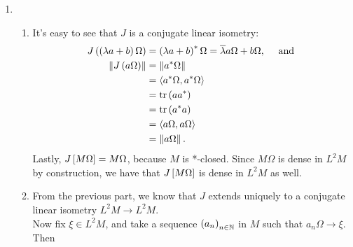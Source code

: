 \documentclass[a4paper,10pt]{report}
\newcommand{\pn}[2]{||#1||_{#2}}
\newcommand{\norm}[1]{||#1||}
\begin{document}
\begin{enumerate}
\begin{enumerate}
\begin{enumerate}
						\begin{proof}
						If $\varphi$ is faithful, then for $x\neq y$, we have 
							\begin{align*}
								\norm{\pi_\varphi(x-y)}^2 &\ge \pn{\pi_\varphi(x-y)\Omega}{\varphi}^2\\
								&= \varphi((x-y)^*(x-y))\\
								& > 0,
							 \end{align*}
							since $(x - y)^*(x- y)$ is a nonzero positive operator.
							Hence, $\pi_\varphi$ is a faithful representation and the claim follows from (2).
							\end{proof}
				\end{enumerate}
		\end{enumerate}
		\setcounter{enumi}{90}
		\newpage
 \item 
		\begin{enumerate}
		\item It's easy to see that $J$ is a conjugate linear isometry: 
                  \begin{align*}
                    J \E \E \lambda a + b \R \Omega \R%
                    &= \E \lambda a + b \R^* \Omega = \ba \lambda a \Omega + b \Omega, \quad \text{ and }\\
                    \NK J \E a \Omega \R \KN%
                    &= \NK a^* \Omega \KN\\
                    &= \ET a^* \Omega , a^* \Omega \TE\\
                    &= \tr \E a a^* \R\\
                    &= \tr \E a^* a \R\\
                    &= \ET a \Omega , a \Omega \TE\\
                    &= \NK a \Omega \KN.
                  \end{align*}
                  Lastly, $J \left[ M \Omega \right] = M \Omega$, because $M$ is *-closed.  Since $M \Omega$ is dense in $L^2 M$ by construction, we have that $J \left[ M \Omega \right]$ is dense in $L^2 M$ as well.
                \item From the previous part, we know that $J$ extends uniquely to a conjugate linear isometry $L^2 M \to L^2 M$.\\
                  Now fix $\xi \in L^2 M$, and take a sequence $\left( a_n \right)_{n \in \mathbb N}$ in $M$ such that $a_n \Omega \to \xi$.  Then 
                  \begin{align*}

\end{align*}
\end{enumerate}
\end{enumerate}
\end{document}
